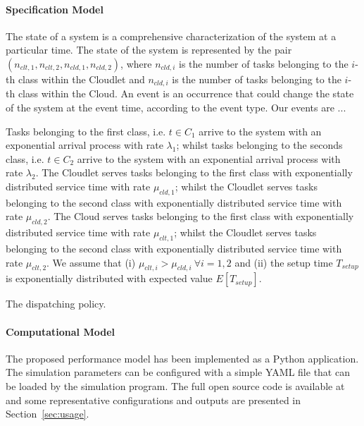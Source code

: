 \paragraph{Specification Model}
The state of a system is a comprehensive characterization of the system at a particular time.
The state of the system is represented by the pair $(n_{clt,1},n_{clt,2},n_{cld,1},n_{cld,2})$, where $n_{cld,i}$ is the number of tasks belonging to the $i$-th class within the Cloudlet and $n_{cld,i}$ is the number of tasks belonging to the $i$-th class within the Cloud.
An event is an occurrence that could change the state of the system at the event time, according to the event type.
Our events are ...

Tasks belonging to the first class, i.e. $t\in C_{1}$ arrive to the system with an exponential arrival process with rate $ \lambda_{1}$; whilst tasks belonging to the seconds class, i.e. $t\in C_{2}$ arrive to the system with an exponential arrival process with rate $ \lambda_{2}$.
The Cloudlet serves tasks belonging to the first class with exponentially distributed service time with rate $\mu_{cld,1}$; whilst the Cloudlet serves tasks belonging to the second class with exponentially distributed service time with rate $\mu_{cld,2}$.
The Cloud serves tasks belonging to the first class with exponentially distributed service time with rate $\mu_{clt,1}$; whilst the Cloudlet serves tasks belonging to the second class with exponentially distributed service time with rate $\mu_{clt,2}$.
We assume that 
(i) $\mu_{clt,i}>\mu_{cld,i}\ \forall i=1,2$ and
(ii) the setup time $T_{setup}$ is exponentially distributed with expected value $E[T_{setup}]$.

\begin{algorithm}
	\SetAlgoLined
	\caption{The dispatching policy.}
	\label{alg:modeling-dispatching-policy}
\end{algorithm}

\paragraph{Computational Model}
The proposed performance model has been implemented as a Python application. 
The simulation parameters can be configured with a simple YAML file that can be loaded by the simulation program.
The full open source code is available at \cite{gmarciani-pydes} and some representative configurations and outputs are presented in Section~\ref{sec:usage}.

